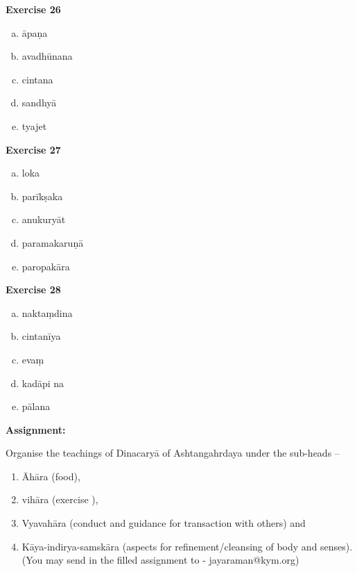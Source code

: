 \begin{multicols}{2}
\textbf{Exercise 26}
\begin{enumerate}[a.]
\item āpaṇa
\item avadhūnana
\item cintana
\item sandhyā 
\item tyajet
\end{enumerate}

\textbf{Exercise 27}
\begin{enumerate}[a.]
\item loka 
\item parīkṣaka 
\item anukuryāt 
\item paramakaruṇā
\item paropakāra
\end{enumerate}

\textbf{Exercise 28}
\begin{enumerate}[a.]
\item naktaṃdina 
\item cintanīya
\item evaṃ 
\item kadāpi na
\item pālana
\end{enumerate}
\end{multicols}

\begin{center}
\textbf{Assignment:}
\end{center}

Organise the teachings of Dinacaryā of Ashtangahrdaya under the sub-heads –

\begin{enumerate}
\item Āhāra (food),
\item vihāra (exercise ),
\item Vyavahāra (conduct and guidance for transaction with others) and
\item Kāya-indirya-samskāra (aspects for refinement/cleansing of body and senses). (You may send in the filled assignment to - jayaraman@kym.org)
\end{enumerate}
\newpage


